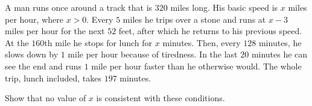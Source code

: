 A man runs once around a track that is $320$ miles long. His basic speed is $x$ miles per hour, where $x>0$. Every $5$ miles he trips over a stone and runs at $x-3$ miles per hour for the next $52$ feet, after which he returns to his previous speed. At the $160$th mile he stops for lunch for $x$ minutes. Then, every $128$ minutes, he slows down by $1$ mile per hour because of tiredness. In the last $20$ minutes he can see the end and runs $1$ mile per hour faster than he otherwise would. The whole trip, lunch included, takes $197$ minutes.

Show that no value of $x$ is consistent with these conditions.
